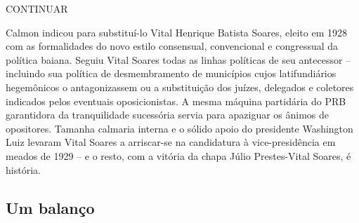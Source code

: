 CONTINUAR

Calmon indicou para substituí-lo Vital Henrique Batista Soares, eleito em 1928 com as formalidades do novo estilo consensual, convencional e congressual da política baiana. Seguiu Vital Soares todas as linhas políticas de seu antecessor -- incluindo sua política de desmembramento de municípios cujos latifundiários hegemônicos o antagonizassem ou a substituição dos juízes, delegados e coletores indicados pelos eventuais oposicionistas. A mesma máquina partidária do PRB garantidora da tranquilidade sucessória servia para apaziguar os ânimos de opositores. Tamanha calmaria interna e o sólido apoio do presidente Washington Luiz levaram Vital Soares a arriscar-se na candidatura à vice-presidência em meados de 1929 -- e o resto, com a vitória da chapa Júlio Prestes-Vital Soares, é história.

\subsection{Um balanço}